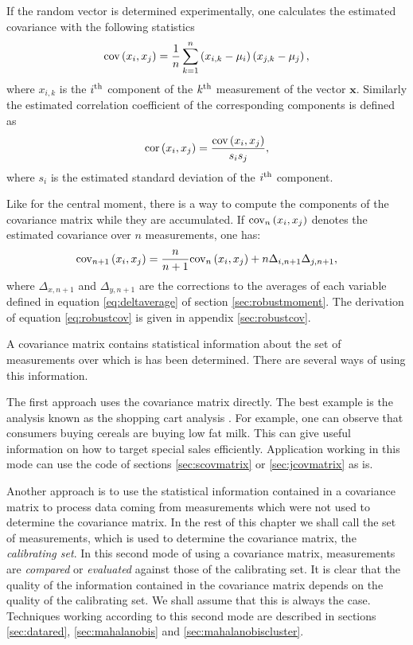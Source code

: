 If the random vector is determined experimentally, one calculates
the estimated covariance with the following statistics
\begin{equation}
 \mathop{\textrm{cov}}\left(x_i,x_j\right)={1\over n}\sum_{k=1}^n
 \left(x_{i,k}-\mu_i\right)\left(x_{j,k}-\mu_j\right),
\end{equation}
where $x_{i,k}$ is the $i^{\mathop{\textrm{th}}}$ component of the $k^{\mathop{\textrm{th}}}$ measurement
of the vector $\textbf{x}$. Similarly the estimated correlation
coefficient of the corresponding components is defined as
\begin{equation}
 \mathop{\textrm{cor}}\left(x_i,x_j\right)={\mathop{\textrm{cov}}\left(x_i,x_j\right)\over s_i s_j},
\end{equation}
where $s_i$ is the estimated standard deviation of the $i^{\mathop{\textrm{th}}}$
component.

Like for the central moment, there is a way to compute the
components of the covariance matrix while they are accumulated. If
${\mathop{\textrm{cov}}}_n\left(x_i,x_j\right)$ denotes the estimated covariance
over $n$ measurements, one has:
\begin{equation}
\label{eq:robustcov}
 {\mathop{\textrm{cov}}}_{n+1}\left(x_i,x_j\right)={n\over
 n+1}{\mathop{\textrm{cov}}}_n\left(x_i,x_j\right)+n\Delta_{i,n+1}\Delta_{j,n+1},
\end{equation}
where $\Delta_{x,n+1}$ and $\Delta_{y,n+1}$ are the corrections to
the averages of each variable defined in equation
\ref{eq:deltaverage} of section \ref{sec:robustmoment}. The
derivation of equation \ref{eq:robustcov} is given in appendix
\ref{sec:robustcov}.

 A covariance matrix
contains statistical information about the set of measurements
over which is has been determined. There are several ways of using
this information.

The first approach uses the covariance matrix directly. The best
example is the analysis known as the shopping cart analysis
\cite{BerLin}. For example, one can observe that consumers buying
cereals are buying low fat milk. This can give useful information
on how to target special sales efficiently. Application working in
this mode can use the code of sections \ref{sec:scovmatrix} or
\ref{sec:jcovmatrix} as is.

Another approach is to use the statistical information contained
in a covariance matrix to process data coming from measurements
which were not used to determine the covariance matrix. In the
rest of this chapter we shall call the set of measurements, which
is used to determine the covariance matrix, the \textsl{calibrating
set}. In this second mode of using a covariance matrix,
measurements are \textsl{compared} or \textsl{evaluated} against those
of the calibrating set. It is clear that the quality of the
information contained in the covariance matrix depends on the
quality of the calibrating set. We shall assume that this is
always the case. Techniques working according to this second mode
are described in sections \ref{sec:datared}, \ref{sec:mahalanobis}
and \ref{sec:mahalanobiscluster}.

